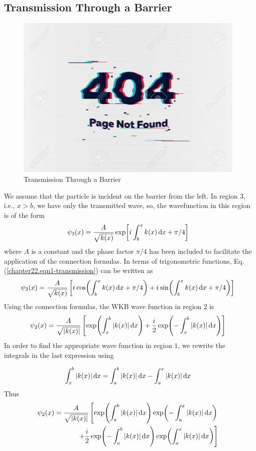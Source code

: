 \subsection{Transmission Through a Barrier}
\begin{figure}
	\centering
	\includegraphics[width=0.5\linewidth]{Pictures/not-found.jpg}
	\caption{Transmission Through a Barrier}
	\label{chapter22.fig5}
\end{figure}
We assume that the particle is incident on the barrier from the left. In region $3$, i.e., $x>b$, we have only the transmitted wave, so, the wavefunction in this region is of the form
\begin{equation}
	\label{chapter22.eqn1-transmission}
	\psi_3\qty(x) = \frac{A}{\sqrt{k(x)}} \exp[{i\mkern1mu} \int_{b}^{x} k(x) \dd{x} + \pi/ 4]
\end{equation}
where $A$ is a constant and the phase factor $\pi/4$
has been included to facilitate the application of the connection formulas. In terms of trigonometric functions, Eq. (\ref{chapter22.eqn1-transmission}) can be written as
\begin{equation}
\label{chapter22.eqn2-transmission}
\psi_3\qty(x) = \frac{A}{\sqrt{k(x)}} \left[{i\mkern1mu} \cos(\int_{b}^{x} k(x) \dd{x} + \pi/ 4) + {i\mkern1mu} \sin(\int_{b}^{x} k(x) \dd{x} + \pi/ 4)\right]
\end{equation}
Using the connection formulas, the WKB wave function in region $2$ is
\begin{equation}
\label{chapter22.eqn3-transmission}
\psi_2(x) = \frac{A}{\sqrt{\abs{k(x)}}} \left[
\exp(\int_{x}^{b} \abs{k(x)} \dd{x}) + \frac{{i\mkern1mu}}{2} \exp(-\int_{x}^{b} \abs{k(x)} \dd{x})
\right]
\end{equation}
In order to find the appropriate wave function in region $1$, we rewrite the integrals in the last expression using

\begin{equation}
\label{chapter22.eqn4-transmission}
\int_{x}^{b} \abs{k(x)} \dd{x} = \int_{a}^{b} \abs{k(x)} \dd{x} - \int_{a}^{x} \abs{k(x)} \dd{x}
\end{equation}
Thus
\begin{equation}
\label{chapter22.eqn5-transmission}
\begin{split}
\psi_2(x) = \frac{A}{\sqrt{\abs{k(x)}}} \left[
\exp(\int_{a}^{b} \abs{k(x)} \dd{x})\exp(-\int_{a}^{x} \abs{k(x)} \dd{x})
 \right.
 \\
 \left.
 +
  \frac{{i\mkern1mu}}{2} \exp(-\int_{a}^{b} \abs{k(x)} \dd{x})\exp(\int_{a}^{x} \abs{k(x)} \dd{x})
\right]
\end{split}
\end{equation}

